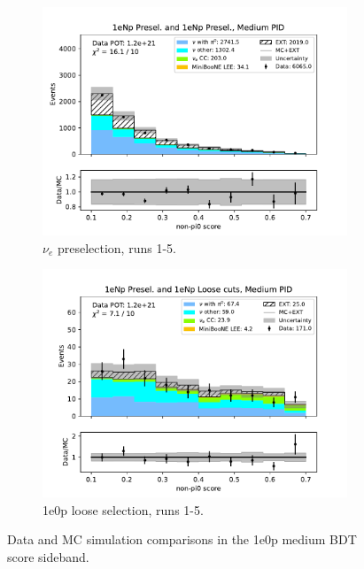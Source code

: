 \begin{figure}[H]
\begin{subfigure}{0.5\linewidth}
        \includegraphics[width=\linewidth]{technote/Sidebands/Figures/NearSideband/near_sideband_nonpi0_score_run1234a4b4c4d5_NP_NP_MEDIUM_PID.pdf}
        \caption{$\nu_e$ preselection, runs 1-5.}
    \end{subfigure}%
    \begin{subfigure}{0.5\linewidth}
        \includegraphics[width=\linewidth]{technote/Sidebands/Figures/NearSideband/near_sideband_nonpi0_score_run1234a4b4c4d5_NP_NPL_MEDIUM_PID.pdf}
        \caption{1e0p loose selection, runs 1-5.}
    \end{subfigure}
    \caption{Data and MC simulation comparisons in the 1e0p medium BDT score sideband.}
\end{figure}

